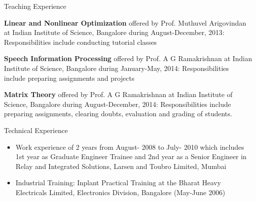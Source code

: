 \documentclass[10pt]{article}
\begin{document}
\begin{cv}
\begin{cvlist}{Teaching Experience}

\item 
 \textbf{Linear and Nonlinear Optimization} offered  by Prof. Muthuvel Arigovindan at  Indian Institute of Science, Bangalore during 
 August-December, 2013: Responsibilities include conducting tutorial classes  
\item
 \textbf{Speech Information Processing}  offered  by Prof. A G Ramakrishnan at  Indian Institute of Science, Bangalore during 
  January-May, 2014: Responsibilities include   preparing assignments and projects
  \item
   \textbf{Matrix Theory}  offered  by Prof. A G Ramakrishnan at  Indian Institute of Science, Bangalore during 
    August-December, 2014: Responsibilities include   preparing assignments, clearing doubts, evaluation and grading of students.
      

\end{cvlist}
\begin{cvlist}{Technical Experience}
\item
\begin{itemize}\itemsep=0.25em
	\item Work experience of 2 years from August- 2008 to July- 2010 which includes 1st year as
Graduate Engineer Trainee and 2nd year as a Senior Engineer in Relay and Integrated
Solutions, Larsen and Toubro Limited, Mumbai
%




\item
Industrial Training:
Inplant Practical Training at the Bharat Heavy
Electricals Limited, Electronics Division, Bangalore
(May-June 2006)



\end{itemize}
\end{cvlist}
\end{cv}
\end{document}
